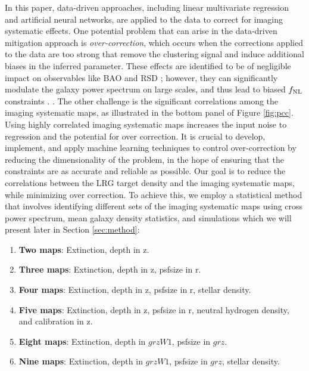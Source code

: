 In this paper, data-driven approaches, including linear multivariate regression and artificial neural networks, are applied to the data to correct for imaging systematic effects. One potential problem that can arise in the data-driven mitigation approach is \textit{over-correction}, which occurs when the corrections applied to the data are too strong that remove the clustering signal and induce additional biases in the inferred parameter. These effects are identified to be of negligible impact on observables like BAO and RSD \citep{merz2021clustering}; however, they can significantly modulate the galaxy power spectrum on large scales, and thus lead to biased $f_{\rm NL}$ constraints \citep{rezaie2021primordial, mueller2022primordial}. . The other challenge is the significant correlations among the imaging systematic maps, as illustrated in the bottom panel of Figure \ref{fig:pcc}. Using highly correlated imaging systematic maps increases the input noise to regression and the potential for over correction. It is crucial to develop, implement, and apply machine learning techniques to control over-correction by reducing the dimensionality of the problem, in the hope of ensuring that the constraints are as accurate and reliable as possible. Our goal is to reduce the correlations between the LRG target density and the imaging systematic maps, while minimizing over correction. To achieve this, we employ a statistical method that involves identifying different sets of the imaging systematic maps using cross power spectrum, mean galaxy density statistics, and simulations which we will present later in Section \ref{sec:method}: 
\begin{enumerate}[itemindent=*]
\item \textbf{Two maps}: Extinction, depth in z.
\item \textbf{Three maps}: Extinction, depth in z, psfsize in r.
\item \textbf{Four maps}: Extinction, depth in z, psfsize in r, stellar density.
\item \textbf{Five maps}: Extinction, depth in z, psfsize in r, neutral hydrogen density, and calibration in z.
\item \textbf{Eight maps}: Extinction, depth in $grzW1$, psfsize in $grz$.
\item \textbf{Nine maps}: Extinction, depth in $grzW1$, psfsize in $grz$, stellar density.
\end{enumerate}
 
